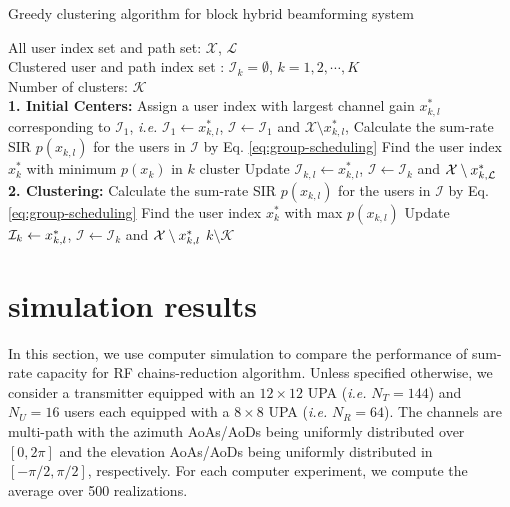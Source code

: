 \documentclass[conference]{IEEEtran}
\begin{document}
{\begin{algorithm}[h] 		
	\caption{Greedy clustering algorithm for block hybrid beamforming system}
	\label{beam_cluster}
	\begin{algorithmic}[1]
		\REQUIRE  \quad
		\STATE	All user index set and path set: $\mathcal{X}$, $\mathcal{L}$\\
		\STATE  Clustered user and path index set : $\mathcal{I}_k=\emptyset$, $k=1,2,\cdots, K$\\
		\STATE  Number of clusters: $\mathcal{K}$\\
		\ENSURE   	
		\STATE \textbf{1. Initial Centers:}
		\STATE Assign a user index with largest channel gain $x^*_{k,l}$ corresponding to ${\mathcal I}_1$, {\em i.e.} $\mathcal{I}_1 \leftarrow  x^*_{k,l}$,  $\bm{\mathcal{I}} \leftarrow \mathcal{I}_1$ and ${\mathcal X}\setminus x_{k,l}^*$,
		\STATE Calculate the sum-rate SIR $p(x_{k,l})$ for the users in $\bm{\mathcal{I}}$ by Eq. \eqref{eq:group-scheduling}
		\ENDFOR
		\STATE Find the user index $x_k^*$ with minimum $p(x_k)$ in $k$ cluster
		\STATE Update $\mathcal{I}_{k,l}\leftarrow x_{k,l}^*$, $\bm{\mathcal{I}}\leftarrow \mathcal{I}_k$ and  ${\cal X}\setminus x_{k,\mathcal{L}}^*$
		\ENDWHILE
		\STATE \textbf{2. Clustering:}
		\STATE  Calculate the sum-rate SIR $p(x_{k,l})$ for the users in $\bm{\mathcal{I}}$ by Eq. \eqref{eq:group-scheduling}
		\ENDFOR
		\STATE Find the user index $x_k^*$ with max $p(x_{k,l})$								
		\STATE	Update ${\cal I}_k \leftarrow  x_{k,l}^*$, $\bm{\mathcal{I}}\leftarrow \mathcal{I}_k$ and ${\cal X}\setminus x_{k,l}^*$	
		\STATE $k \setminus {\mathcal{K}}$
		\ENDIF
		\ENDFOR	
	\end{algorithmic}
\end{algorithm}









\section{simulation results}
In this section, we use computer simulation to compare the performance of sum-rate capacity for RF chains-reduction algorithm. Unless specified otherwise, we consider a transmitter equipped with an $12\times 12$ UPA ({\em i.e.} $N_T=144$) and $N_U=16$ users each equipped with a $8\times 8$ UPA ({\em i.e.} $N_R=64$). The channels are multi-path with the azimuth AoAs/AoDs being uniformly distributed over $[0, 2\pi]$ and the elevation AoAs/AoDs being uniformly distributed in $[-\pi/2, \pi/2]$, respectively. For each computer experiment, we compute the average over 500 realizations.

}
\end{document}
